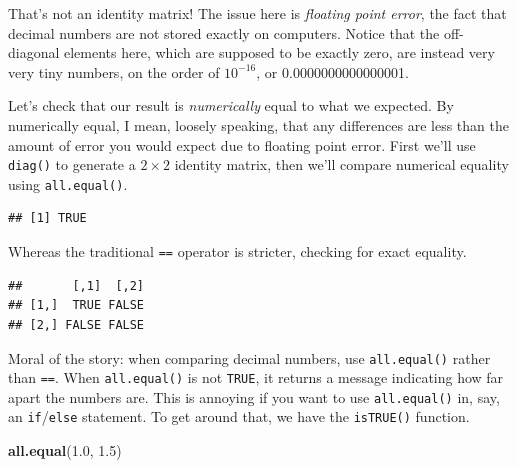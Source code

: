 \documentclass[12pt,oneside,openany]{book}
\newenvironment{Shaded}{\begin{snugshade}}{\end{snugshade}}
\newcommand{\KeywordTok}[1]{\textcolor[rgb]{0.13,0.29,0.53}{\textbf{#1}}}
\newcommand{\DecValTok}[1]{\textcolor[rgb]{0.00,0.00,0.81}{#1}}
\newcommand{\FloatTok}[1]{\textcolor[rgb]{0.00,0.00,0.81}{#1}}
\newcommand{\StringTok}[1]{\textcolor[rgb]{0.31,0.60,0.02}{#1}}
\newcommand{\OperatorTok}[1]{\textcolor[rgb]{0.81,0.36,0.00}{\textbf{#1}}}
\newcommand{\NormalTok}[1]{#1}
\begin{document}
That's not an identity matrix! The issue here is \emph{floating point
error}, the fact that decimal numbers are not stored exactly on
computers. Notice that the off-diagonal elements here, which are
supposed to be exactly zero, are instead very very tiny numbers, on the
order of \(10^{-16}\), or 0.0000000000000001.

Let's check that our result is \emph{numerically} equal to what we
expected. By numerically equal, I mean, loosely speaking, that any
differences are less than the amount of error you would expect due to
floating point error. First we'll use \texttt{diag()} to generate a
\(2 \times 2\) identity matrix, then we'll compare numerical equality
using \texttt{all.equal()}.

\begin{Shaded}
\end{Shaded}

\begin{verbatim}
## [1] TRUE
\end{verbatim}

Whereas the traditional \texttt{==} operator is stricter, checking for
exact equality.

\begin{Shaded}
\end{Shaded}

\begin{verbatim}
##       [,1]  [,2]
## [1,]  TRUE FALSE
## [2,] FALSE FALSE
\end{verbatim}

Moral of the story: when comparing decimal numbers, use
\texttt{all.equal()} rather than \texttt{==}. When \texttt{all.equal()}
is not \texttt{TRUE}, it returns a message indicating how far apart the
numbers are. This is annoying if you want to use \texttt{all.equal()}
in, say, an \texttt{if}/\texttt{else} statement. To get around that, we
have the \texttt{isTRUE()} function.

\begin{Shaded}
\begin{Highlighting}[]
\KeywordTok{all.equal}\NormalTok{(}\FloatTok{1.0}\NormalTok{, }\FloatTok{1.5}\NormalTok{)}
\end{Highlighting}
\end{Shaded}
\end{document}
